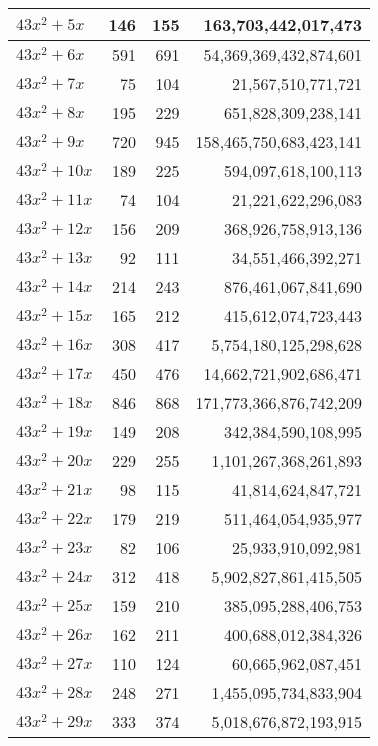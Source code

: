 \documentclass[a4paper]{amsproc}
\theoremstyle{plain}
\begin{document}
\begin{longtable}{ | l | r | r | r | }
$43x^2 + 5x$ & 146 & 155 & 163{,}703{,}442{,}017{,}473 \\ \hline
$43x^2 + 6x$ & 591 & 691 & 54{,}369{,}369{,}432{,}874{,}601 \\ \hline
$43x^2 + 7x$ & 75 & 104 & 21{,}567{,}510{,}771{,}721 \\ \hline
$43x^2 + 8x$ & 195 & 229 & 651{,}828{,}309{,}238{,}141 \\ \hline
$43x^2 + 9x$ & 720 & 945 & 158{,}465{,}750{,}683{,}423{,}141 \\ \hline
$43x^2 + 10x$ & 189 & 225 & 594{,}097{,}618{,}100{,}113 \\ \hline
$43x^2 + 11x$ & 74 & 104 & 21{,}221{,}622{,}296{,}083 \\ \hline
$43x^2 + 12x$ & 156 & 209 & 368{,}926{,}758{,}913{,}136 \\ \hline
$43x^2 + 13x$ & 92 & 111 & 34{,}551{,}466{,}392{,}271 \\ \hline
$43x^2 + 14x$ & 214 & 243 & 876{,}461{,}067{,}841{,}690 \\ \hline
$43x^2 + 15x$ & 165 & 212 & 415{,}612{,}074{,}723{,}443 \\ \hline
$43x^2 + 16x$ & 308 & 417 & 5{,}754{,}180{,}125{,}298{,}628 \\ \hline
$43x^2 + 17x$ & 450 & 476 & 14{,}662{,}721{,}902{,}686{,}471 \\ \hline
$43x^2 + 18x$ & 846 & 868 & 171{,}773{,}366{,}876{,}742{,}209 \\ \hline
$43x^2 + 19x$ & 149 & 208 & 342{,}384{,}590{,}108{,}995 \\ \hline
$43x^2 + 20x$ & 229 & 255 & 1{,}101{,}267{,}368{,}261{,}893 \\ \hline
$43x^2 + 21x$ & 98 & 115 & 41{,}814{,}624{,}847{,}721 \\ \hline
$43x^2 + 22x$ & 179 & 219 & 511{,}464{,}054{,}935{,}977 \\ \hline
$43x^2 + 23x$ & 82 & 106 & 25{,}933{,}910{,}092{,}981 \\ \hline
$43x^2 + 24x$ & 312 & 418 & 5{,}902{,}827{,}861{,}415{,}505 \\ \hline
$43x^2 + 25x$ & 159 & 210 & 385{,}095{,}288{,}406{,}753 \\ \hline
$43x^2 + 26x$ & 162 & 211 & 400{,}688{,}012{,}384{,}326 \\ \hline
$43x^2 + 27x$ & 110 & 124 & 60{,}665{,}962{,}087{,}451 \\ \hline
$43x^2 + 28x$ & 248 & 271 & 1{,}455{,}095{,}734{,}833{,}904 \\ \hline
$43x^2 + 29x$ & 333 & 374 & 5{,}018{,}676{,}872{,}193{,}915 \\ \hline

\end{longtable}
\end{document}
